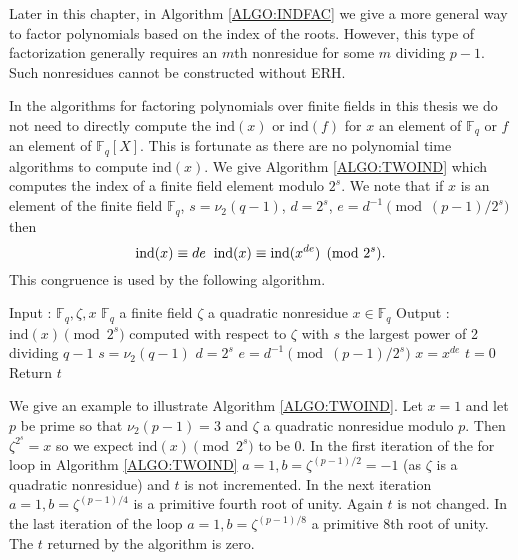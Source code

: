 \documentclass{article}
\theoremstyle{plain}
\theoremstyle{definition}
\def\Fq {{ \mathbb{F} _ {q} }}
\def\ind {{ \mathrm{ind} }}
\begin{document}
		Later in this chapter, in Algorithm \ref{ALGO:INDFAC} we give a more general way to factor polynomials based on the index of the roots. However, this type of factorization generally requires an $m$th nonresidue for some $m$ dividing $p-1$. Such nonresidues cannot be constructed without ERH.
		
		In the algorithms for factoring polynomials over finite fields in this thesis we do not need to directly compute the $\ind(x)$ or $\ind(f)$ for $x$ an element of $\Fq$ or $f$ an element of $\Fq[X]$. This is fortunate as there are no polynomial time algorithms to compute $\ind(x)$. We give Algorithm \ref{ALGO:TWOIND} which computes the index of a finite field element modulo $2^s$. We note that if $x$ is an element of the finite field $\Fq$, $s=\nu_2(q-1)$, $d=2^s$, $e=d^{-1} \pmod {(p-1)/2^s}$ then 
		\[ \ind(x) \equiv de\hspace{2mm} \ind(x) \equiv \ind(x^{de}) \pmod {2^s}. \]
		This congruence is used by the following algorithm.
		
		\begin{singlespace}
    \begin{algorithm}[H]
		\DontPrintSemicolon
		\label{ALGO:TWOIND}
		\caption{$\rm{TWO}\_\rm{IND}$} 	
		\DontPrintSemicolon	
		    Input : $\Fq,\zeta,x$ \;
				\hspace{2mm} $\Fq$ a finite field \;
				\hspace{2mm} $\zeta$ a quadratic nonresidue \;
				\hspace{2mm} $x \in \Fq$ \;
				Output : $\ind(x) \pmod {2^s}$ computed with respect to $\zeta$ with $s$ the largest power of 2 dividing $q-1$ \;
				\;
				$s=\nu_2(q-1)$ \;
				$d=2^s$ \;
				$e=d^{-1} \pmod {(p-1)/2^s}$ \;
				$x=x^{de}$ \;
				$t=0$ \;
        Return $t$ \;
    \end{algorithm}
		\end{singlespace}
		\vspace{5mm}		
		
		We give an example to illustrate Algorithm \ref{ALGO:TWOIND}. Let $x=1$ and let $p$ be prime so that $\nu_2(p-1)=3$ and $\zeta$ a quadratic nonresidue modulo $p$. Then $\zeta^{2^s}=x$ so we expect $\ind(x) \pmod{2^s}$ to be 0. In the first iteration of the for loop in Algorithm \ref{ALGO:TWOIND} $a=1,b=\zeta^{(p-1)/2}=-1$ (as $\zeta$ is a quadratic nonresidue) and $t$ is not incremented. In the next iteration $a=1,b=\zeta^{(p-1)/4}$ is a primitive fourth root of unity. Again $t$ is not changed. In the last iteration of the loop $a=1,b=\zeta^{(p-1)/8}$ a primitive 8th root of unity. The $t$ returned by the algorithm is zero. 
		
\end{document}
